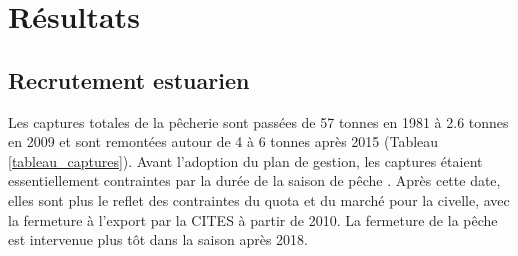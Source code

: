 \documentclass[10pt,twocolumn,titlepage,twoside]{article}\usepackage[]{graphicx}\usepackage[]{color}
\begin{document}
\section{Résultats}


\subsection{Recrutement estuarien}

Les captures totales de la pêcherie sont passées de 57 tonnes en
1981 à  2.6 tonnes en 2009 et sont remontées autour de 4 à 6 tonnes
après 2015 (Tableau \ref{tableau_captures}).
Avant l'adoption du plan de gestion, les captures étaient essentiellement contraintes par la durée de la saison de pêche
\citep{briand_dynamique_2009}. Après cette date, elles sont plus le reflet des
contraintes du quota et du marché pour la civelle, avec la fermeture à l'export
par la CITES à partir de 2010. La fermeture de la pêche est intervenue plus tôt
dans la saison après 2018.
\small
\end{document}
